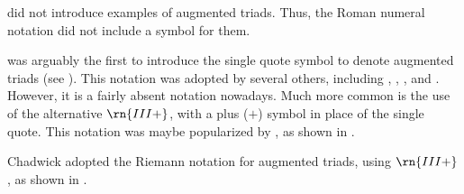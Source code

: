 \textcite{weber1817versuch} did not introduce examples of
augmented triads. Thus, the Roman numeral notation did not
include a symbol for them. 

\textcite{richter1860lehrbuch} was arguably the first to
introduce the single quote symbol to denote augmented triads
(see ). This
notation was adopted by several others, including
\textcite{jadassohn1883lehrbuch},
\textcite{broekhoven1889system}, \textcite{buwa1893schule},
and \textcite{shepard1896harmony}. However, it is a fairly
absent notation nowadays. Much more common is the use of the
alternative $\rn{III+}$, with a plus ($+$) symbol in place
of the single quote. This notation was maybe popularized by
\textcite{riemann1890katechismus}, as shown in
.





Chadwick adopted the Riemann notation for augmented triads,
using $\rn{III+}$, as shown in
.  